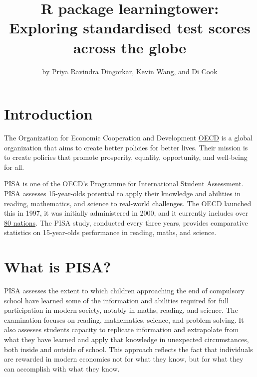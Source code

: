 \title{R package learningtower: Exploring standardised test scores
across the globe}
\author{by Priya Ravindra Dingorkar, Kevin Wang, and Di Cook}

\maketitle


\hypertarget{introduction}{%
\section{Introduction}\label{introduction}}

The Organization for Economic Cooperation and Development
\href{OECD\%20-\%20https://www.oecd.org/about/}{OECD} is a global
organization that aims to create better policies for better lives. Their
mission is to create policies that promote prosperity, equality,
opportunity, and well-being for all.

\href{PISA\%20-\%20https://www.oecd.org/pisa/}{PISA} is one of the
OECD's Programme for International Student Assessment. PISA assesses
15-year-olds potential to apply their knowledge and abilities in
reading, mathematics, and science to real-world challenges. The OECD
launched this in 1997, it was initially administered in 2000, and it
currently includes over
\href{https://www.oecd.org/pisa/aboutpisa/pisa-participants.htm}{80
nations}. The PISA study, conducted every three years, provides
comparative statistics on 15-year-olds performance in reading, maths,
and science.

\hypertarget{what-is-pisa}{%
\section{What is PISA?}\label{what-is-pisa}}

PISA assesses the extent to which children approaching the end of
compulsory school have learned some of the information and abilities
required for full participation in modern society, notably in maths,
reading, and science. The examination focuses on reading, mathematics,
science, and problem solving. It also assesses students capacity to
replicate information and extrapolate from what they have learned and
apply that knowledge in unexpected circumstances, both inside and
outside of school. This approach reflects the fact that individuals are
rewarded in modern economies not for what they know, but for what they
can accomplish with what they know.

